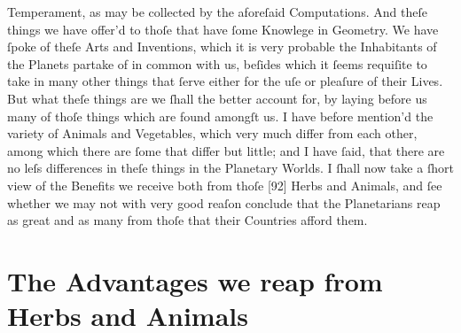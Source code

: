 \documentclass[letterpaper]{book}
\begin{document}
Temperament, as may be collected by the aforeſaid Computations. And theſe
things we have offer'd to thoſe that have ſome Knowlege in Geometry.  We
have ſpoke of theſe Arts and Inventions, which it is very probable the
Inhabitants of the Planets partake of in common with us, beſides which it
ſeems requiſite to take in many other things that ſerve either for the uſe
or pleaſure of their Lives. But what theſe things are we ſhall the better
account for, by laying before us many of thoſe things which are found
amongſt us.  I have before mention'd the variety of Animals and Vegetables,
which very much differ from each other, among which there are ſome that
differ but little; and I have ſaid, that there are no leſs differences in
theſe things in the Planetary Worlds.  I ſhall now take a ſhort view of the
Benefits we receive both from thoſe [92] Herbs and Animals, and ſee whether
we may not with very good reaſon conclude that the Planetarians reap as
great and as many from thoſe that their Countries afford them.


\section{The Advantages we reap from Herbs and Animals}
\end{document}
